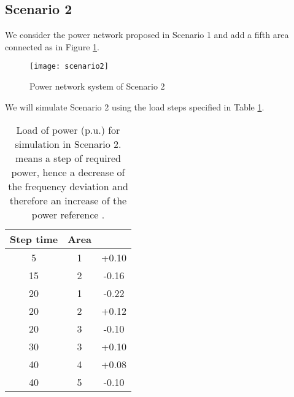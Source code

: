 \documentclass[a4paper]{article}
\begin{document}
          \subsection{Scenario 2}
               \label{sec:scenario2}
               We consider the power network proposed in Scenario 1 and add a fifth area connected as in Figure \ref{fig:scenario2}.
               \begin{figure}[!ht]
                 \centering
                 \texttt{[image: scenario2]}
                 \caption{Power network system of Scenario 2}
                 \label{fig:scenario2}
               \end{figure}
               We will simulate Scenario 2 using the load steps specified in Table \ref{tab:simulationscen2}.
               \begin{table}[!ht]
                 \centering
                 \begin{tabular}{|c|c|c|}
                   \hline
                   Step time  &  Area  &  \\
                   \hline
                   5               &      1        &   +0.10             \\
                   \hline
                   15             &      2        &   -0.16             \\
                   \hline
                   20             &      1        &   -0.22             \\
                   \hline
                   20             &      2        &   +0.12             \\
                   \hline
                   20             &      3        &   -0.10             \\
                   \hline
                   30             &      3        &   +0.10             \\
                   \hline
                   40             &      4        &   +0.08             \\
                   \hline
                   40             &      5        &   -0.10             \\
                   \hline
                 \end{tabular}
                 \caption{Load of power  (p.u.) for simulation in Scenario 2.  means a step of required power, hence a decrease of the frequency deviation  and therefore an increase of the power reference .}
                 \label{tab:simulationscen2}
               \end{table}
\end{document}
